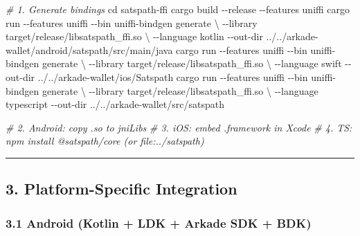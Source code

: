 \documentclass[
]{article}
\newenvironment{Shaded}{}{}
\newcommand{\AttributeTok}[1]{\textcolor[rgb]{0.49,0.56,0.16}{#1}}
\newcommand{\BuiltInTok}[1]{\textcolor[rgb]{0.00,0.50,0.00}{#1}}
\newcommand{\CommentTok}[1]{\textcolor[rgb]{0.38,0.63,0.69}{\textit{#1}}}
\newcommand{\DataTypeTok}[1]{\textcolor[rgb]{0.56,0.13,0.00}{#1}}
\newcommand{\ExtensionTok}[1]{#1}
\newcommand{\NormalTok}[1]{#1}
\begin{document}
\begin{Shaded}
\begin{Highlighting}[]
\CommentTok{\# 1. Generate bindings}
\BuiltInTok{cd}\NormalTok{ satspath{-}ffi}
\ExtensionTok{cargo}\NormalTok{ build }\AttributeTok{{-}{-}release} \AttributeTok{{-}{-}features}\NormalTok{ uniffi}
\ExtensionTok{cargo}\NormalTok{ run }\AttributeTok{{-}{-}features}\NormalTok{ uniffi }\AttributeTok{{-}{-}bin}\NormalTok{ uniffi{-}bindgen generate }\DataTypeTok{\textbackslash{}}
  \AttributeTok{{-}{-}library}\NormalTok{ target/release/libsatspath\_ffi.so }\DataTypeTok{\textbackslash{}}
  \AttributeTok{{-}{-}language}\NormalTok{ kotlin }\AttributeTok{{-}{-}out{-}dir}\NormalTok{ ../../arkade{-}wallet/android/satspath/src/main/java}
\ExtensionTok{cargo}\NormalTok{ run }\AttributeTok{{-}{-}features}\NormalTok{ uniffi }\AttributeTok{{-}{-}bin}\NormalTok{ uniffi{-}bindgen generate }\DataTypeTok{\textbackslash{}}
  \AttributeTok{{-}{-}library}\NormalTok{ target/release/libsatspath\_ffi.so }\DataTypeTok{\textbackslash{}}
  \AttributeTok{{-}{-}language}\NormalTok{ swift }\AttributeTok{{-}{-}out{-}dir}\NormalTok{ ../../arkade{-}wallet/ios/Satspath}
\ExtensionTok{cargo}\NormalTok{ run }\AttributeTok{{-}{-}features}\NormalTok{ uniffi }\AttributeTok{{-}{-}bin}\NormalTok{ uniffi{-}bindgen generate }\DataTypeTok{\textbackslash{}}
  \AttributeTok{{-}{-}library}\NormalTok{ target/release/libsatspath\_ffi.so }\DataTypeTok{\textbackslash{}}
  \AttributeTok{{-}{-}language}\NormalTok{ typescript }\AttributeTok{{-}{-}out{-}dir}\NormalTok{ ../../arkade{-}wallet/src/satspath}

\CommentTok{\# 2. Android: copy .so to jniLibs}
\CommentTok{\# 3. iOS: embed .framework in Xcode}
\CommentTok{\# 4. TS: npm install @satspath/core (or file:../satspath)}
\end{Highlighting}
\end{Shaded}

\begin{center}\rule{0.5\linewidth}{0.5pt}\end{center}

\hypertarget{platform-specific-integration}{%
\subsection{3. Platform-Specific
Integration}\label{platform-specific-integration}}

\hypertarget{android-kotlin-ldk-arkade-sdk-bdk}{%
\subsubsection{3.1 Android (Kotlin + LDK + Arkade SDK +
BDK)}\label{android-kotlin-ldk-arkade-sdk-bdk}}
\end{document}
